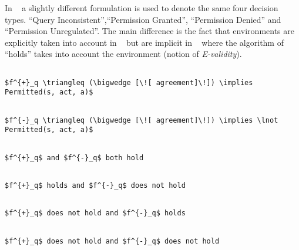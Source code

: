 In ~\cite{pucella2006} a slightly different formulation is used to denote the same four decision types. ``Query Inconsistent'',``Permission Granted'', ``Permission Denied'' and ``Permission Unregulated''. The main difference is the fact that environments are explicitly taken into account in ~\cite{Tschantz} but are implicit in ~\cite{pucella2006} where the algorithm of ``holds'' takes into account the environment (notion of \emph{E-validity}).

\lstset{mathescape, language=AST} 
\begin{lstlisting}[frame=single, caption={$f^{+}_q$},label={lst:fplusformula}]

$f^{+}_q \triangleq (\bigwedge [\![ agreement]\!]) \implies Permitted(s, act, a)$ 

\end{lstlisting}

\lstset{mathescape, language=AST} 
\begin{lstlisting}[frame=single, caption={$f^{-}_q$},label={lst:fminusformula}]

$f^{-}_q \triangleq (\bigwedge [\![ agreement]\!]) \implies \lnot Permitted(s, act, a)$ 

\end{lstlisting}


\lstset{mathescape, language=AST} 
\begin{lstlisting}[frame=single, caption={Answerable Queries: Query Inconsistent},label={lst:queryinconsistentdecision}]

$f^{+}_q$ and $f^{-}_q$ both hold

\end{lstlisting}

\lstset{mathescape, language=AST} 
\begin{lstlisting}[frame=single, caption={Answerable Queries: Permission Granted},label={lst:permission granteddecision}]

$f^{+}_q$ holds and $f^{-}_q$ does not hold

\end{lstlisting}

\lstset{mathescape, language=AST} 
\begin{lstlisting}[frame=single, caption={Answerable Queries: Permission Denied},label={lst:permission denieddecision}]

$f^{+}_q$ does not hold and $f^{-}_q$ holds

\end{lstlisting}

\lstset{mathescape, language=AST} 
\begin{lstlisting}[frame=single, caption={Answerable Queries: Permission Unregulated},label={lst:permission unregulateddecision}]

$f^{+}_q$ does not hold and $f^{-}_q$ does not hold

\end{lstlisting}

